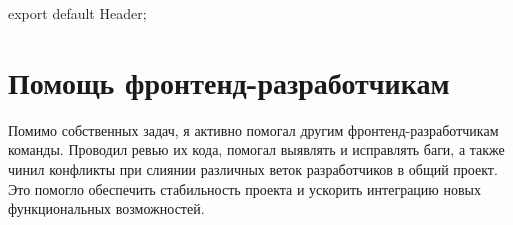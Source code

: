 \documentclass[a4paper,12pt]{article}
\begin{document}
\begin{description}
\item export default Header;
\end{description}

\section*{Помощь фронтенд-разработчикам}
Помимо собственных задач, я активно помогал другим фронтенд-разработчикам команды. Проводил ревью их кода, помогал выявлять и исправлять баги, а также чинил конфликты при слиянии различных веток разработчиков в общий проект. Это помогло обеспечить стабильность проекта и ускорить интеграцию новых функциональных возможностей.
\end{document}

